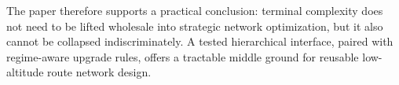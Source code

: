 \documentclass[review,authoryear]{elsarticle}
\begin{document}
The paper therefore supports a practical conclusion: terminal complexity does not need to be lifted wholesale into strategic network optimization, but it also cannot be collapsed indiscriminately. A tested hierarchical interface, paired with regime-aware upgrade rules, offers a tractable middle ground for reusable low-altitude route network design.




\end{document}
